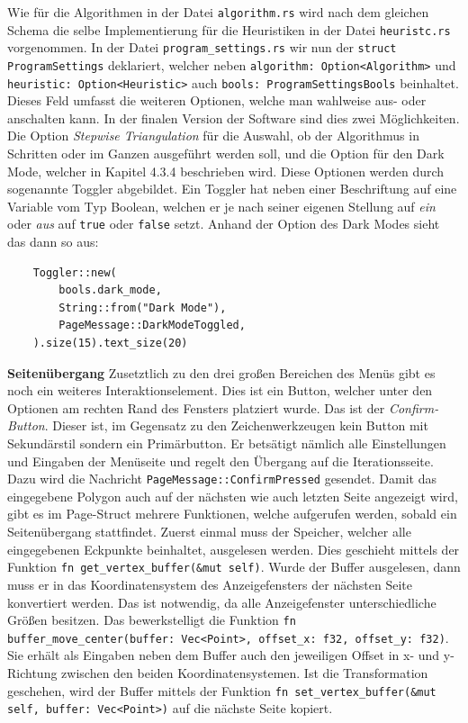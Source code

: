 Wie für die Algorithmen in der Datei \lstinline{algorithm.rs} wird nach dem gleichen Schema die selbe Implementierung für die Heuristiken in der Datei \lstinline{heuristc.rs} vorgenommen.
In der Datei \lstinline{program_settings.rs} wir nun der \lstinline{struct ProgramSettings} deklariert, welcher neben  \lstinline{algorithm: Option<Algorithm>} und \lstinline{heuristic: Option<Heuristic>}
auch \lstinline{bools: ProgramSettingsBools} beinhaltet. Dieses Feld umfasst die weiteren Optionen, welche man wahlweise aus- oder anschalten kann. In der finalen Version der Software sind dies zwei Möglichkeiten.
Die Option \emph{Stepwise Triangulation} für die Auswahl, ob der Algorithmus in Schritten oder im Ganzen ausgeführt werden soll, und die Option für den Dark Mode, welcher in Kapitel 4.3.4 beschrieben wird.
Diese Optionen werden durch sogenannte Toggler abgebildet. Ein Toggler hat neben einer Beschriftung auf eine Variable vom Typ Boolean, welchen er je nach seiner eigenen Stellung auf \emph{ein} oder \emph{aus} auf 
\lstinline{true} oder \lstinline{false} setzt. Anhand der Option des Dark Modes sieht das dann so aus:

\begin{lstlisting}
    Toggler::new(
        bools.dark_mode,
        String::from("Dark Mode"),
        PageMessage::DarkModeToggled,
    ).size(15).text_size(20)
\end{lstlisting}\pagebreak

\textbf{\large{Seitenübergang}}\linebreak
Zusetztlich zu den drei großen Bereichen des Menüs gibt es noch ein weiteres Interaktionselement. Dies ist ein Button, welcher unter den Optionen am rechten Rand des Fensters platziert wurde.
Das ist der \emph{Confirm-Button}. Dieser ist, im Gegensatz zu den Zeichenwerkzeugen kein Button mit Sekundärstil sondern ein Primärbutton. Er betsätigt nämlich alle Einstellungen und Eingaben der Menüseite und
regelt den Übergang auf die Iterationsseite. Dazu wird die Nachricht \lstinline{PageMessage::ConfirmPressed} gesendet. Damit das eingegebene Polygon auch auf der nächsten wie auch letzten Seite angezeigt wird, gibt es im Page-Struct
mehrere Funktionen, welche aufgerufen werden, sobald ein Seitenübergang stattfindet. Zuerst einmal muss der Speicher, welcher alle eingegebenen Eckpunkte beinhaltet, ausgelesen werden. Dies geschieht mittels der Funktion 
\lstinline{fn get_vertex_buffer(&mut self)}. Wurde der Buffer ausgelesen, dann muss er in das Koordinatensystem des Anzeigefensters der nächsten Seite konvertiert werden. Das ist notwendig, da alle Anzeigefenster unterschiedliche Größen besitzen.
Das bewerkstelligt die Funktion \lstinline{fn buffer_move_center(buffer: Vec<Point>, offset_x: f32, offset_y: f32)}. Sie erhält als Eingaben neben dem Buffer auch den jeweiligen Offset in x- und y-Richtung
zwischen den beiden Koordinatensystemen. Ist die Transformation geschehen, wird der Buffer mittels der Funktion \lstinline{fn set_vertex_buffer(&mut self, buffer: Vec<Point>)} auf die nächste Seite kopiert.

